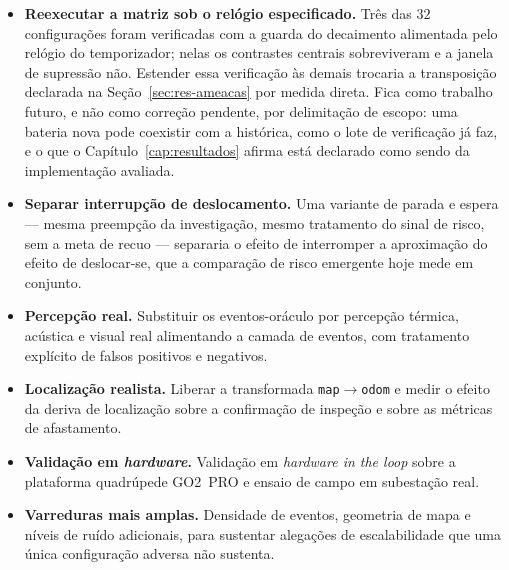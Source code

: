 \begin{itemize}
    \item \textbf{Reexecutar a matriz sob o relógio especificado.} Três das $32$
    configurações foram verificadas com a guarda do decaimento alimentada pelo relógio
    do temporizador; nelas os contrastes centrais sobreviveram e a janela de supressão
    não. Estender essa verificação às demais trocaria a transposição declarada na
    Seção~\ref{sec:res-ameacas} por medida direta. Fica como trabalho futuro, e não
    como correção pendente, por delimitação de escopo: uma bateria nova pode coexistir
    com a histórica, como o lote de verificação já faz, e o que o Capítulo~\ref{cap:resultados}
    afirma está declarado como sendo da implementação avaliada.

    \item \textbf{Separar interrupção de deslocamento.} Uma variante de parada e
    espera --- mesma preempção da investigação, mesmo tratamento do sinal de risco,
    sem a meta de recuo --- separaria o efeito de interromper a aproximação do efeito
    de deslocar-se, que a comparação de risco emergente hoje mede em conjunto.

    \item \textbf{Percepção real.} Substituir os eventos-oráculo por percepção
    térmica, acústica e visual real alimentando a camada de eventos, com tratamento
    explícito de falsos positivos e negativos.

    \item \textbf{Localização realista.} Liberar a transformada
    \texttt{map}$\rightarrow$\texttt{odom} e medir o efeito da deriva de localização
    sobre a confirmação de inspeção e sobre as métricas de afastamento.

    \item \textbf{Validação em \textit{hardware}.} Validação em \textit{hardware
    in the loop} sobre a plataforma quadrúpede GO2~PRO e ensaio de campo em
    subestação real.

    \item \textbf{Varreduras mais amplas.} Densidade de eventos, geometria de mapa e
    níveis de ruído adicionais, para sustentar alegações de escalabilidade que uma
    única configuração adversa não sustenta.
\end{itemize}

